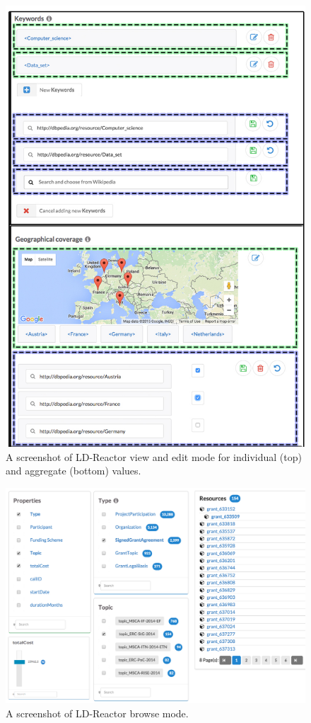 \documentclass{acm_proc_article-sp}
\begin{document}

\begin{figure}[htb] 
  \includegraphics[width=1\linewidth]{images/viewedit.png}
  \caption{A screenshot of LD-Reactor view and edit mode for individual (top) and aggregate (bottom) values.}
  \label{fig:ldrViewEdit}
\end{figure}

\begin{figure}[htb] 
  \includegraphics[width=1\linewidth]{images/facets.jpg}
  \caption{A screenshot of LD-Reactor browse mode.}
  \label{fig:ldrBrowse}
\end{figure}
\end{document}
